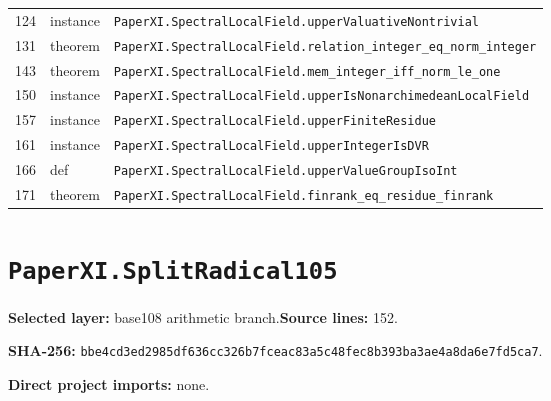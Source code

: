 \documentclass[10pt,oneside]{book}
\begin{document}
\begin{longtable}{@{}p{}p{}p{}@{}}
124&instance&\nolinkurl{PaperXI.SpectralLocalField.upperValuativeNontrivial}\\

131&theorem&\nolinkurl{PaperXI.SpectralLocalField.relation_integer_eq_norm_integer}\\

143&theorem&\nolinkurl{PaperXI.SpectralLocalField.mem_integer_iff_norm_le_one}\\

150&instance&\nolinkurl{PaperXI.SpectralLocalField.upperIsNonarchimedeanLocalField}\\

157&instance&\nolinkurl{PaperXI.SpectralLocalField.upperFiniteResidue}\\

161&instance&\nolinkurl{PaperXI.SpectralLocalField.upperIntegerIsDVR}\\

166&def&\nolinkurl{PaperXI.SpectralLocalField.upperValueGroupIsoInt}\\

171&theorem&\nolinkurl{PaperXI.SpectralLocalField.finrank_eq_residue_finrank}\\

\bottomrule\end{longtable}

\section{\texorpdfstring{\nolinkurl{PaperXI.SplitRadical105}}{PaperXI.SplitRadical105}}\label{module:PaperXI.SplitRadical105}

\textbf{Selected layer:} base108 arithmetic branch.\quad\textbf{Source lines:} 152.\par\textbf{SHA-256:} {\scriptsize\nolinkurl{bbe4cd3ed2985df636cc326b7fceac83a5c48fec8b393ba3ae4a8da6e7fd5ca7}}.


\textbf{Direct project imports:} none.
\end{document}
